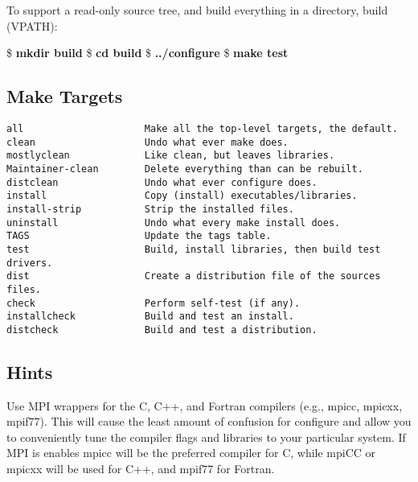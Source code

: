 To support a read-only source tree, and build everything in a 
directory, build (VPATH):
\begin{ttfamily}
\begin{mdseries}
\linebreak
\$ \textbf{mkdir build}\linebreak
\$ \textbf{cd build}\linebreak
\$ \textbf{../configure}\linebreak
\$ \textbf{make test}\linebreak
\end{mdseries}
\end{ttfamily}

\subsection{Make Targets}

\begin{ttfamily}
\begin{mdseries}
\begin{verbatim}
all                     Make all the top-level targets, the default.
clean                   Undo what ever make does.
mostlyclean             Like clean, but leaves libraries.
Maintainer-clean        Delete everything than can be rebuilt.
distclean               Undo what ever configure does.
install                 Copy (install) executables/libraries.
install-strip           Strip the installed files.
uninstall               Undo what every make install does.
TAGS                    Update the tags table.
test                    Build, install libraries, then build test drivers.
dist                    Create a distribution file of the sources files.
check                   Perform self-test (if any).
installcheck            Build and test an install.
distcheck               Build and test a distribution.
\end{verbatim}
\end{mdseries}
\end{ttfamily}

\subsection{Hints}

Use MPI wrappers for the C, C++, and Fortran compilers (e.g.,
mpicc, mpicxx, mpif77).  This will cause the least amount of 
confusion for configure and allow you to conveniently tune the 
compiler flags and libraries to your particular system. If MPI 
is enables mpicc will be the preferred compiler for C, while 
mpiCC or mpicxx will be used for C++, and mpif77 for Fortran.

